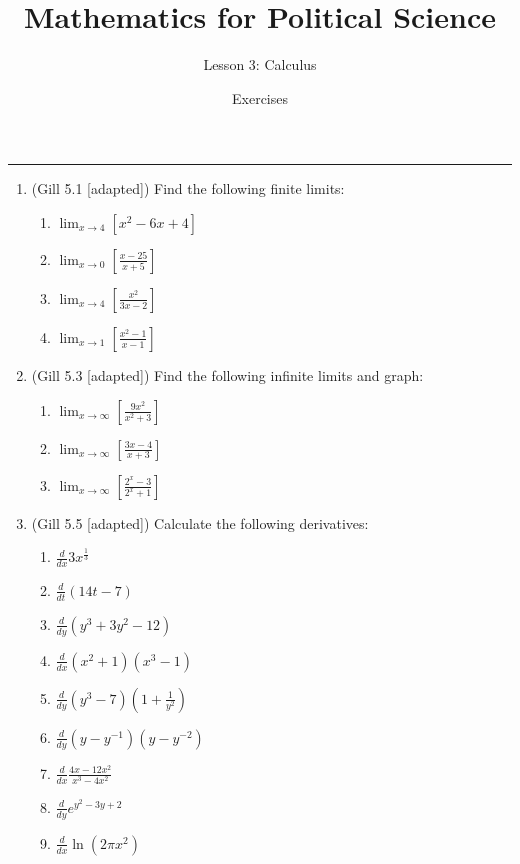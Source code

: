 \documentclass[11pt]{article}
\begin{document}
\title{\Large{\bf{\vspace{-100pt}Mathematics for Political Science \vspace{-15pt}}}}
\author{\large{Lesson 3: Calculus}}
\date{\vspace{-5pt}\large{Exercises \vspace{-10pt}}}

\maketitle

\hrule


\begin{enumerate}


\item (Gill 5.1 [adapted]) Find the following finite limits:
\begin{enumerate}
\item $\displaystyle\lim_{x\rightarrow 4} [x^2 - 6x + 4]$ %
\item $\displaystyle\lim_{x\rightarrow 0} [\frac{x-25}{x+5}]$ %
\item $\displaystyle\lim_{x\rightarrow 4} [\frac{x^2}{3x-2}]$ %
\item $\displaystyle\lim_{x\rightarrow 1} [\frac{x^2 - 1}{x-1}]$ %
\end{enumerate}



\item (Gill 5.3 [adapted]) Find the following infinite limits and graph:
\begin{enumerate}
\item $\displaystyle\lim_{x\rightarrow \infty} [\frac{9x^2}{x^2 + 3}]$ %
\item $\displaystyle\lim_{x\rightarrow \infty} [\frac{3x-4}{x+3}]$ %
\item $\displaystyle\lim_{x\rightarrow \infty} [\frac{2^x - 3}{2^x + 1}]$ %
\end{enumerate}



\item (Gill 5.5 [adapted]) Calculate the following derivatives:
\begin{enumerate}
 \item $\frac{d}{dx} 3x^{\frac{1}{3}}$
 \item $\frac{d}{dt}(14t - 7)$
 \item $\frac{d}{dy}(y^3 + 3y^2 - 12)$ 
 \item $\frac{d}{dx}(x^2 + 1)(x^3 - 1)$
 \item $\frac{d}{dy}(y^3 - 7)(1 + \frac{1}{y^2})$
 \item $\frac{d}{dy}(y - y^{-1})(y - y^{-2})$
 \item $\frac{d}{dx}\frac{4x - 12x^2}{x^3-4x^2}$
 \item $\frac{d}{dy}e^{y^2 - 3y + 2}$
 \item $\frac{d}{dx}\ln (2\pi x^2)$
\end{enumerate}



\end{enumerate}
\end{document}
